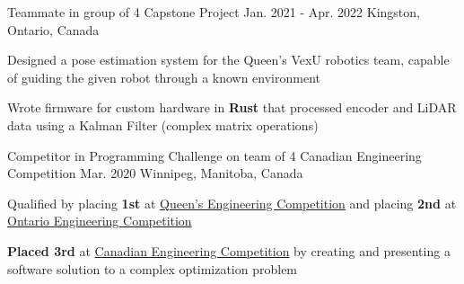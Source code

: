
\begin{cventries}

  \cventry
    {Teammate in group of 4} %
    {Capstone Project} %
    {Jan. 2021 - Apr. 2022} %
    {Kingston, Ontario, Canada} %
    {
      \begin{cvitems} %
        \item{Designed a pose estimation system for the Queen's VexU robotics team, capable of guiding the given robot through a known environment}
        \item{Wrote firmware for custom hardware in \textbf{Rust} that processed encoder and LiDAR data using a Kalman Filter (complex matrix operations)
        }
      \end{cvitems}
    }

  \cventry
    {Competitor in Programming Challenge on team of 4} %
    {Canadian Engineering Competition} %
    {Mar. 2020} %
    {Winnipeg, Manitoba, Canada} %
    {
      \begin{cvitems} %
        \item{Qualified by placing \textbf{1st} at \href{https://quengcomp.ca/}{Queen's Engineering Competition} and placing \textbf{2nd} at \href{https://www.oec2020.ca/}{Ontario Engineering Competition}}
        \item{\textbf{Placed 3rd} at \href{https://cfes.ca/cec/}{Canadian Engineering Competition} by creating and presenting a software solution to a complex optimization problem}
      \end{cvitems}
    }


\end{cventries}
